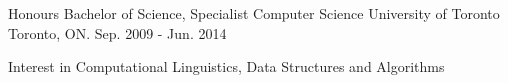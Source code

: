 

\begin{cventries}

  \cventry
    {Honours Bachelor of Science, Specialist Computer Science} %
    {University of Toronto} %
    {Toronto, ON.} %
    {Sep. 2009 - Jun. 2014} %
    {
      \begin{cvitems} %
        \item {Interest in Computational Linguistics, Data Structures and Algorithms}
      \end{cvitems}
    }

\end{cventries}